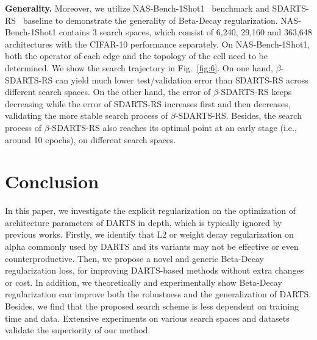 \documentclass[10pt,twocolumn,letterpaper]{article}
\begin{document}
\noindent\textbf{Generality.} Moreover, we utilize NAS-Bench-1Shot1~\cite{1shot1} benchmark and SDARTS-RS~\cite{sdarts} baseline to demonstrate the generality of Beta-Decay regularization. NAS-Bench-1Shot1 contains 3 search spaces, which consist of 6,240, 29,160 and 363,648 architectures with the CIFAR-10 performance separately. On NAS-Bench-1Shot1, both the operator of each edge and the topology of the cell need to be determined. 
We show the search trajectory in Fig.~\ref{fig:6}. On one hand, $\beta$-SDARTS-RS can yield much lower test/validation error than SDARTS-RS across different search spaces. On the other hand, the error of $\beta$-SDARTS-RS keeps decreasing while the error of SDARTS-RS increases first and then decreases, validating the more stable search process of $\beta$-SDARTS-RS. Besides, the search process of $\beta$-SDARTS-RS also reaches its optimal point at an early stage (i.e., around 10 epochs), on different search spaces.

\section{Conclusion} \label{sec:Con}
In this paper, we investigate the explicit regularization on the optimization of architecture parameters of DARTS in depth, which is typically ignored by previous works. Firstly, we identify that L2 or weight decay regularization on alpha commonly used by DARTS and its variants may not be effective or even counterproductive. Then, we propose a novel and generic Beta-Decay regularization loss, for improving DARTS-based methods without extra changes or cost. In addition, we theoretically and experimentally show Beta-Decay regularization can improve both the robustness and the generalization of DARTS. Besides, we find that the proposed search scheme is less dependent on training time and data. Extensive experiments on various search spaces and datasets validate the superiority of our method.

{\small


}
\end{document}
